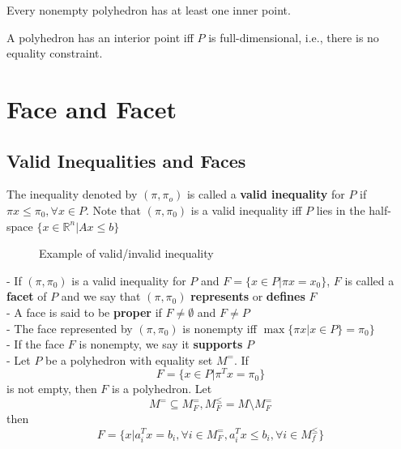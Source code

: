 					\begin{corollary}
						Every nonempty polyhedron has at least one inner point.
					\end{corollary}

					\begin{corollary}
						A polyhedron has an interior point iff $P$ is full-dimensional, i.e., there is no equality constraint.
					\end{corollary}

			\section{Face and Facet}
				\subsection{Valid Inequalities and Faces}
					The inequality denoted by $(\pi, \pi_o)$ is called a \textbf{valid inequality} for $P$ if $\pi x \le \pi_0, \forall x \in P$. Note that $(\pi, \pi_0)$ is a valid inequality iff $P$ lies in the half-space $\{x\in \mathbb{R}^n|Ax\le b\}$\\
					\begin{figure}[!ht]
					\centering
					\caption{Example of valid/invalid inequality}
					\end{figure}
					- If $(\pi, \pi_0)$ is a valid inequality for $P$ and $F=\{x\in P|\pi x=x_0\}$, $F$ is called a \textbf{facet} of $P$ and we say that $(\pi, \pi_0)$ \textbf{represents} or \textbf{defines} $F$\\
					- A face is said to be \textbf{proper} if $F\ne \emptyset$ and $F\ne P$\\
					- The face represented by $(\pi, \pi_0)$ is nonempty iff $\max \{\pi x |x\in P\}=\pi_0\}$\\
					- If the face $F$ is nonempty, we say it \textbf{supports} $P$\\
					- Let $P$ be a polyhedron with equality set $M^=$. If 
					\begin{equation}F=\{x\in P | \pi^T x = \pi_0\}  \end{equation}
					is not empty, then $F$ is a polyhedron. Let 
					\begin{equation}M^= \subseteq M_F^=, M_F^{\le}=M \setminus M_F^= \end{equation}
					then 
					\begin{equation}F=\{x | a_i^T x=b_i, \forall i \in M_F^=, a_i^T x \le b_i, \forall i \in M_f^{\le}\} \end{equation}

